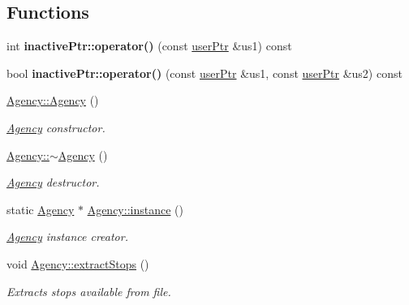 \subsection*{Functions}
\begin{DoxyCompactItemize}
\item 
\mbox{\label{group___agency_ga165eb4b729955163f0c52852aa554af1}} 
int {\bfseries inactive\+Ptr\+::operator()} (const \hyperlink{structuser_ptr}{user\+Ptr} \&us1) const
\item 
\mbox{\label{group___agency_gadc40c7d895103613550bb1c415f849f0}} 
bool {\bfseries inactive\+Ptr\+::operator()} (const \hyperlink{structuser_ptr}{user\+Ptr} \&us1, const \hyperlink{structuser_ptr}{user\+Ptr} \&us2) const
\item 
\mbox{\label{group___agency_gaf6fc6c4dec00025fce567183f67edbaa}} 
\hyperlink{group___agency_gaf6fc6c4dec00025fce567183f67edbaa}{Agency\+::\+Agency} ()
\begin{DoxyCompactList}\small\item\em \hyperlink{class_agency}{Agency} constructor. \end{DoxyCompactList}\item 
\mbox{\label{group___agency_ga922750a7051987df9bb697769fdf0256}} 
\hyperlink{group___agency_ga922750a7051987df9bb697769fdf0256}{Agency\+::$\sim$\+Agency} ()
\begin{DoxyCompactList}\small\item\em \hyperlink{class_agency}{Agency} destructor. \end{DoxyCompactList}\item 
static \hyperlink{class_agency}{Agency} $\ast$ \hyperlink{group___agency_ga573fab41076b962289fad1f14031b68c}{Agency\+::instance} ()
\begin{DoxyCompactList}\small\item\em \hyperlink{class_agency}{Agency} instance creator. \end{DoxyCompactList}\item 
\mbox{\label{group___agency_ga10184101969b3eeea8eea72cb058fbd4}} 
void \hyperlink{group___agency_ga10184101969b3eeea8eea72cb058fbd4}{Agency\+::extract\+Stops} ()
\begin{DoxyCompactList}\small\item\em Extracts stops available from file. \end{DoxyCompactList}\end{DoxyCompactItemize}
